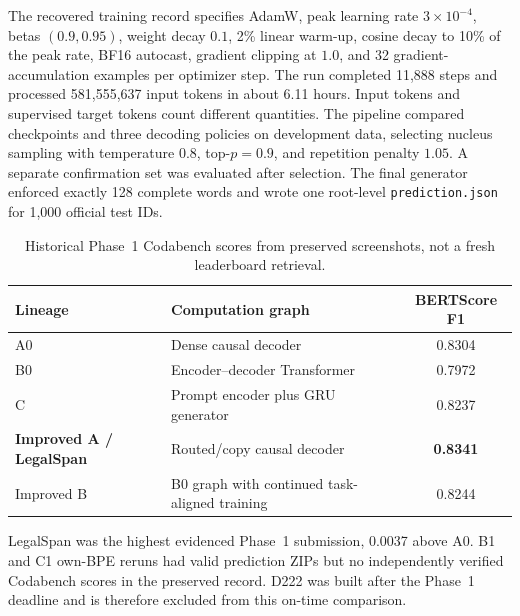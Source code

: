 The recovered training record specifies AdamW, peak learning rate
$3\times10^{-4}$, betas $(0.9,0.95)$, weight decay $0.1$, 2\% linear warm-up,
cosine decay to 10\% of the peak rate, BF16 autocast, gradient clipping at
$1.0$, and 32 gradient-accumulation examples per optimizer step. The run
completed 11,888 steps and processed 581,555,637 input tokens in about 6.11
hours. Input tokens and supervised target tokens count different quantities.
The pipeline compared checkpoints and three decoding policies on development
data, selecting nucleus sampling with temperature $0.8$, top-$p=0.9$, and
repetition penalty $1.05$. A separate confirmation set was evaluated after
selection. The final generator enforced exactly 128 complete words and wrote
one root-level \texttt{prediction.json} for 1,000 official test IDs.

\begin{table}[H]
\centering
\caption{Historical Phase~1 Codabench scores from preserved screenshots,
not a fresh leaderboard retrieval.}
\begin{tabular}{llc}
\toprule
Lineage & Computation graph & BERTScore F1 \\
\midrule
A0 & Dense causal decoder & 0.8304 \\
B0 & Encoder--decoder Transformer & 0.7972 \\
C & Prompt encoder plus GRU generator & 0.8237 \\
\textbf{Improved A / LegalSpan} & Routed/copy causal decoder & \textbf{0.8341} \\
Improved B & B0 graph with continued task-aligned training & 0.8244 \\
\bottomrule
\end{tabular}
\end{table}
LegalSpan was the highest evidenced Phase~1 submission, 0.0037 above A0.
B1 and C1 own-BPE reruns had valid prediction ZIPs but no independently
verified Codabench scores in the preserved record. D222 was built after the
Phase~1 deadline and is therefore excluded from this on-time comparison.


